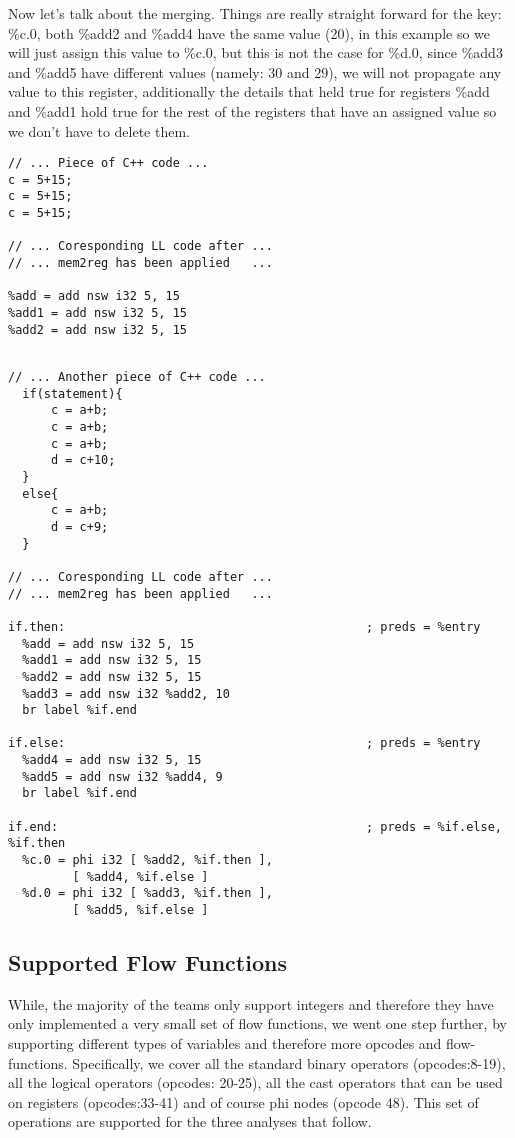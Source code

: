 Now let's talk about the merging. Things are really straight forward for the key: \%c.0, both \%add2 and \%add4 have the same value (20), in this example so we will just assign this value to \%c.0, but this is not the case for \%d.0, since \%add3 and \%add5 have different values (namely: 30 and 29), we will not propagate any value to this register, additionally the details that held true for registers \%add and \%add1 hold true for the rest of the registers that have an assigned value so we don't have to delete them. 


\begin{lstlisting}[caption=SSA preview, label=SSA]
// ... Piece of C++ code ...
c = 5+15;
c = 5+15;
c = 5+15;

// ... Coresponding LL code after ...
// ... mem2reg has been applied   ...

%add = add nsw i32 5, 15
%add1 = add nsw i32 5, 15
%add2 = add nsw i32 5, 15

\end{lstlisting}

\begin{lstlisting}[caption=SSA within a branch preview, label=SSAFF]

// ... Another piece of C++ code ...
  if(statement){
	  c = a+b;
	  c = a+b;
	  c = a+b;
	  d = c+10;
  }
  else{
	  c = a+b;
	  d = c+9;
  }

// ... Coresponding LL code after ...
// ... mem2reg has been applied   ...

if.then:                                          ; preds = %entry
  %add = add nsw i32 5, 15
  %add1 = add nsw i32 5, 15
  %add2 = add nsw i32 5, 15
  %add3 = add nsw i32 %add2, 10
  br label %if.end

if.else:                                          ; preds = %entry
  %add4 = add nsw i32 5, 15
  %add5 = add nsw i32 %add4, 9
  br label %if.end

if.end:                                           ; preds = %if.else, %if.then
  %c.0 = phi i32 [ %add2, %if.then ], 
         [ %add4, %if.else ]
  %d.0 = phi i32 [ %add3, %if.then ], 
         [ %add5, %if.else ]

  \end{lstlisting}
  
  
\subsection*{Supported Flow Functions}
While, the majority of the teams only support integers and therefore they have only implemented a very small set of flow functions, we went one step further, by supporting different types of variables and therefore more opcodes and flow-functions. Specifically, we cover all the standard binary operators (opcodes:8-19), all the logical operators (opcodes: 20-25), all the cast operators that can be used on registers (opcodes:33-41) and of course phi nodes (opcode 48). This set of operations are supported for the three analyses that follow.



